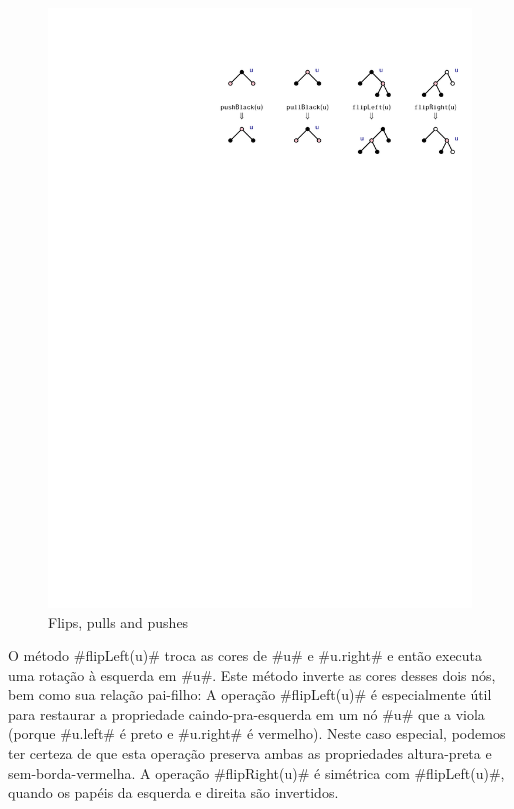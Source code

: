 \begin{figure}
	\begin{center}
		\includegraphics[width=\ScaleIfNeeded]{figs/flippullpush}
	\end{center}
	\caption{Flips, pulls and pushes}
\end{figure}

O método #flipLeft(u)# troca as cores de #u# e #u.right#
e então executa uma rotação à esquerda em #u#. Este método inverte as
cores desses dois nós, bem como sua relação pai-filho:
A operação #flipLeft(u)#
é especialmente útil para restaurar a propriedade caindo-pra-esquerda em um nó
#u# que a viola (porque #u.left# é preto e #u.right# é vermelho).
Neste caso especial, podemos ter certeza de que esta operação preserva ambas
as propriedades altura-preta e sem-borda-vermelha. A operação #flipRight(u)#
é simétrica com #flipLeft(u)#, quando os papéis da esquerda e direita são invertidos.

